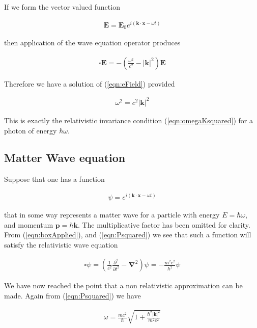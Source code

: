 \documentclass[]{eliblog}
\newcommand{\Abs}[1]{{\left\lvert{#1}\right\rvert}}
\newcommand{\BE}[0]{\mathbf{E}}
\newcommand{\Bk}[0]{\mathbf{k}}
\newcommand{\Bp}[0]{\mathbf{p}}
\newcommand{\Bx}[0]{\mathbf{x}}
\newcommand{\spacegrad}[0]{\boldsymbol{\nabla}}
\newcommand{\delambertian}[0]{\square}
\begin{document}
If we form the vector valued function

\begin{align}\label{eqn:testSolutionE}
\BE = \BE_0 e^{ i( \Bk \cdot \Bx - \omega t ) }
\end{align}

then application of the wave equation operator produces

\begin{align}\label{eqn:boxApplied}
\delambertian \BE = -\left( \frac{\omega^2}{c^2} - \Abs{\Bk}^2 \right) \BE
\end{align}

Therefore we have a solution of (\ref{eqn:eField}) provided

\begin{align}
\omega^2 = c^2 \Abs{\Bk}^2
\end{align}

This is exactly the relativistic invariance condition (\ref{eqn:omegaKsquared}) for a photon of energy $\hbar \omega$.

\subsection{Matter Wave equation}

Suppose that one has a function

\begin{align}\label{eqn:waveFunction}
\psi = e^{ i( \Bk \cdot \Bx - \omega t) }
\end{align}

that in some way represents a matter wave for a particle with energy $E = \hbar \omega$, and momentum
 $\Bp = \hbar \Bk$.  The multiplicative factor has been omitted for clarity.
From (\ref{eqn:boxApplied}), and
(\ref{eqn:Psquared})
we see that such a function will satisfy the relativistic wave equation

\begin{align}
\delambertian \psi = \left( \frac{1}{c^2}\frac{\partial^2}{{\partial t}^2} - \spacegrad^2 \right) \psi = - \frac{m^2 c^2}{\hbar^2} \psi
\end{align}

We have now reached the point that a non relativistic approximation can be made.
Again from (\ref{eqn:Psquared}) we have

\begin{align}
\omega = \frac{m c^2}{\hbar} \sqrt{ 1 + \frac{\hbar^2 \Abs{\Bk}^2}{m^2 c^2}}
\end{align}
\end{document}
